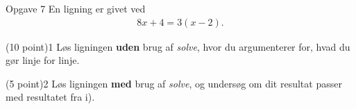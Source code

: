 \begin{opgavetekst}{Opgave 7}
	En ligning er givet ved
	\begin{align*}
		8x+4 = 3(x-2).
	\end{align*}
\end{opgavetekst}
\begin{delopgave}{(10 point)}{1}
	Løs ligningen \textbf{uden} brug af \textit{solve}, hvor du argumenterer for, hvad du gør linje for linje.
\end{delopgave}
\begin{delopgave}{(5 point)}{2}
	Løs ligningen \textbf{med} brug af \textit{solve}, og undersøg om dit resultat passer med resultatet fra i).
\end{delopgave}




